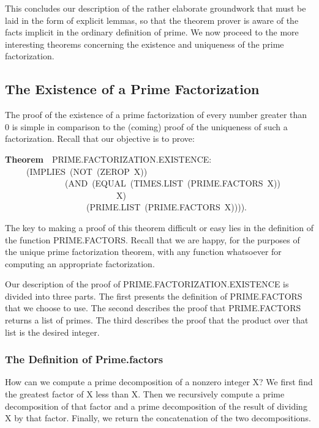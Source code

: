 \documentclass[10pt]{book}
\newenvironment{pubasis}{\begin{flushleft}}{\end{flushleft}}
\newcommand{\axiomordefinition}[1]{\vspace{6pt}\Large\textsf{\textbf{#1}}\normalsize}
\begin{document}
This concludes our description of the rather
elaborate groundwork that must be laid in
the form of explicit lemmas, so that the
theorem prover is aware of the facts implicit
in the ordinary definition of prime.  We now
proceed to the more interesting theorems concerning
the existence and uniqueness of the prime factorization.
\subsection{The Existence of a Prime Factorization}
\label{SSSPRIMEFACTORIZATIONEXISTENCE}
The proof of the existence of a prime factorization of
every number greater than 0 is simple in comparison
to the (coming)  proof of the uniqueness of such a factorization.
Recall that our objective is to prove:

\begin{pubasis}
\axiomordefinition{Theorem}~~PRIME.FACTORIZATION.EXISTENCE:\\
~~~~~(IMPLIES~(NOT~(ZEROP~X))\\
~~~~~~~~~~~~~~(AND~(EQUAL~(TIMES.LIST~(PRIME.FACTORS~X))\\
~~~~~~~~~~~~~~~~~~~~~~~~~~X)\\
~~~~~~~~~~~~~~~~~~~(PRIME.LIST~(PRIME.FACTORS~X)))).\\
\end{pubasis}
The key to making a proof of this theorem difficult or
easy lies in the definition of the function
PRIME.FACTORS.  Recall that we are happy, for
the purposes of the unique prime factorization theorem,
with any function whatsoever for computing an appropriate factorization.

Our description of the proof of PRIME.FACTORIZATION.EXISTENCE
is divided into three parts.  The first  presents the
definition of PRIME.FACTORS that we choose to use.  The
second  describes the proof that PRIME.FACTORS returns a
list of primes.  The third  describes the proof that
the product over that list is the desired integer.

\subsubsection{The Definition of Prime.factors}
How can we compute a prime
decomposition of a nonzero integer X?
We  first find the greatest factor of
X less than X.  Then we  recursively compute a  prime decomposition of
that factor and a prime decomposition of the result of dividing X by that factor.  Finally, we return the concatenation of the two decompositions.
\end{document}

